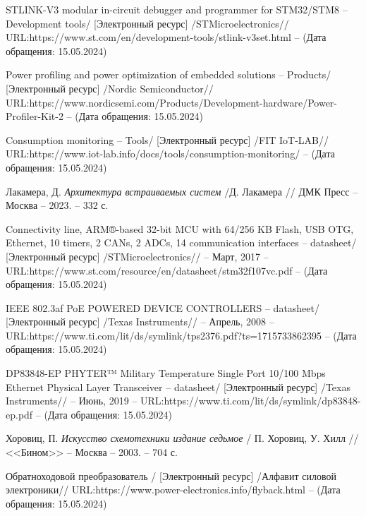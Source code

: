 \begin{thebibliography}{00}



 STLINK-V3 modular in-circuit debugger and programmer for STM32/STM8
-- Development tools/
[Электронный ресурс]
/STMicroelectronics//
URL:https://www.st.com/en/development-tools/stlink-v3set.html --
(Дата обращения: 15.05.2024)

 Power profiling and power optimization of embedded solutions
-- Products/
[Электронный ресурс]
/Nordic Semiconductor//
URL:https://www.nordicsemi.com/Products/Development-hardware/Power-Profiler-Kit-2 --
(Дата обращения: 15.05.2024)

 Consumption monitoring
-- Tools/
[Электронный ресурс]
/FIT IoT-LAB//
URL:https://www.iot-lab.info/docs/tools/consumption-monitoring/ --
(Дата обращения: 15.05.2024)


 Лакамера, Д.
\emph{Архитектура встраиваемых систем} /Д. Лакамера // ДМК Пресс --
Москва -- 2023. -- 332 с.

 Connectivity line, ARM®-based 32-bit MCU with 64/256 KB Flash,
 USB OTG, Ethernet, 10 timers, 2 CANs, 2 ADCs, 14 communication interfaces -- datasheet/
  [Электронный ресурс]
 /STMicroelectronics// -- Март, 2017 -- 
 URL:https://www.st.com/resource/en/datasheet/stm32f107vc.pdf --
 (Дата обращения: 15.05.2024)

 IEEE 802.3af PoE POWERED DEVICE CONTROLLERS -- datasheet/
  [Электронный ресурс] /Texas Instruments// -- Апрель, 2008 
  -- URL:https://www.ti.com/lit/ds/symlink/tps2376.pdf?ts=1715733862395 --
  (Дата обращения: 15.05.2024)

 DP83848-EP PHYTER™ Military Temperature Single Port
   10/100 Mbps Ethernet
  Physical Layer Transceiver -- datasheet/
  [Электронный ресурс] /Texas Instruments// -- Июнь, 2019 
  -- URL:https://www.ti.com/lit/ds/symlink/dp83848-ep.pdf --
  (Дата обращения: 15.05.2024)

 Хоровиц, П.
\emph{Искусство схемотехники издание седьмое} / П. Хоровиц, У. Хилл // <<Бином>> --
Москва -- 2003. -- 704 с.

 Обратноходовой преобразователь /
  [Электронный ресурс] /Алфавит силовой электроники// 
   URL:https://www.power-electronics.info/flyback.html --
  (Дата обращения: 15.05.2024)


\end{thebibliography}
